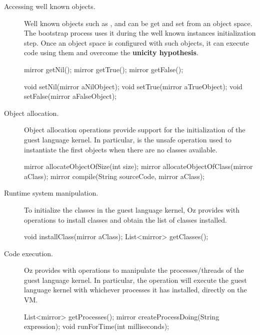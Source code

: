 \begin{description}
\item[Accessing well known objects.] Well known objects such as ,  and  can be get and set from an object space. The bootstrap process uses it during the well known instances initialization step. Once an object space is configured with such objects, it can execute code using them and overcome the \textbf{unicity hypothesis}.
\begin{code}
mirror getNil();
mirror getTrue();
mirror getFalse();

void setNil(mirror aNilObject);
void setTrue(mirror aTrueObject);
void setFalse(mirror aFalseObject);
\end{code}

\item[Object allocation.] Object allocation operations provide support for the initialization of the guest language kernel. In particular,  is the unsafe operation used to instantiate the first objects when there are no classes available.
\begin{code}
mirror allocateObjectOfSize(int size);
mirror allocateObjectOfClass(mirror aClass);
mirror compile(String sourceCode, mirror aClass);
\end{code}

\item[Runtime system manipulation.] To initialize the classes in the guest language kernel, Oz provides with operations to install classes and obtain the list of classes installed.
\begin{code}
void installClass(mirror aClass);
List<mirror> getClasses();
\end{code}

\item[Code execution.] Oz provides with operations to manipulate the processes/threads of the guest language kernel. In particular, the  operation will execute the guest language kernel with whichever processes it has installed, directly on the VM.
\begin{code}
List<mirror> getProcesses();
mirror createProcessDoing(String expression);
void runForTime(int milliseconds);
\end{code}
\end{description}

